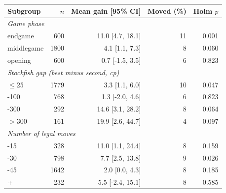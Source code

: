 \setlength{\tabcolsep}{3pt}\begin{tabular}{lrrrr}
\toprule
Subgroup & $n$ & Mean gain [95\% CI] & Moved (\%) & Holm $p$ \\
\midrule
\multicolumn{5}{l}{\emph{Game phase}} \\
\quad endgame & 600 & 11.0 [4.7, 18.1] & 11 & 0.001 \\
\quad middlegame & 1800 & 4.1 [1.1, 7.3] & 8 & 0.060 \\
\quad opening & 600 & 0.7 [-1.5, 3.5] & 6 & 0.823 \\
\multicolumn{5}{l}{\emph{Stockfish gap (best minus second, cp)}} \\
\quad $\le$25 & 1779 & 3.3 [1.1, 6.0] & 10 & 0.047 \\
\quad 25-100 & 768 & 1.3 [-2.0, 4.6] & 6 & 0.823 \\
\quad 100-300 & 292 & 14.6 [3.1, 28.2] & 8 & 0.064 \\
\quad $>$300 & 161 & 19.9 [2.6, 44.7] & 4 & 0.097 \\
\multicolumn{5}{l}{\emph{Number of legal moves}} \\
\quad 1-15 & 328 & 11.0 [1.1, 24.4] & 8 & 0.159 \\
\quad 16-30 & 798 & 7.7 [2.5, 13.8] & 9 & 0.026 \\
\quad 31-45 & 1642 & 2.0 [0.0, 4.3] & 8 & 0.185 \\
\quad 46+ & 232 & 5.5 [-2.4, 15.1] & 8 & 0.585 \\
\bottomrule
\end{tabular}
